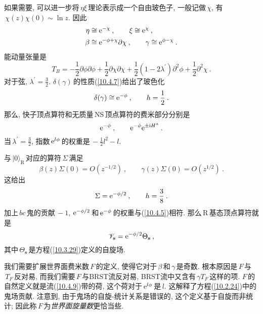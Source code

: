 如果需要, 可以进一步将$\,\eta\xi\,$理论表示成一个自由玻色子, 一般记做$\,\chi$, 有$\,\chi(z)\chi(0)\sim \ln z$. 因此
\begin{subequations}
\begin{align}
    \eta &\cong \mathrm{e}^{-\chi} \:, \qquad \xi \cong \mathrm{e}^{\chi} \:, \label{10.4.19a} \\
    \beta &\cong \mathrm{e}^{-\phi+\chi}\partial\chi\:, \qquad \gamma\cong \mathrm{e}^{\phi-\chi} \:. \label{10.4.19b}
\end{align} \label{10.4.19}
\end{subequations}
能动量张量是
\begin{equation}
    T_{B} = -\frac{1}{2}\partial\phi \partial\phi +\frac{1}{2}\partial\chi\partial\chi 
    +\frac{1}{2}(1-2\lambda^{\prime})\partial^{2}\phi + \frac{1}{2} \partial^{2}\chi \:. \label{10.4.20}
\end{equation}
对于弦, $\lambda^{\prime}=\frac{3}{2}$. $\delta(\gamma)\,$的性质(\ref{10.4.7})给出了玻色化
\begin{equation}
    \delta(\gamma)\cong \mathrm{e}^{-\phi}\:, \qquad h=\frac{1}{2} \:. \label{10.4.21}
\end{equation}
那么, 快子顶点算符和无质量\,NS\,顶点算符的费米部分分别是
\begin{equation}
    \mathrm{e}^{-\phi} \:, \qquad \mathrm{e}^{-\phi} \mathrm{e}^{\pm \mathrm{i} H^{a}}\:. \label{10.4.22}
\end{equation}
当$\,\lambda^{\prime}=\frac{3}{2}$, 指数$\,\mathrm{e}^{l\phi}\,$的权重是$\,-\frac{1}{2}l^{2}-l$.

与$\,\lvert 0\rangle _{\mathrm{R}}\,$对应的算符$\,\Sigma\,$满足
\begin{equation}
    \beta(z)\Sigma(0) = O(z^{-1/2}) \:, \qquad \gamma(z)\Sigma(0) = O(z^{1/2}) \:. \label{10.4.23}
\end{equation}
这给出
\begin{equation}
    \Sigma = \mathrm{e}^{-\phi/2} \:, \qquad h = \frac{3}{8} \: .\label{10.4.24}
\end{equation}
加上$\,bc\,$鬼的贡献$\,-1$, $\mathrm{e}^{-\phi/2}\,$和$\,\mathrm{e}^{-\phi}\,$的权重与(\ref{10.4.5})相符. 那么\,R\,基态顶点算符就是
\begin{equation}
    \mathscr{V}_{\mathbf{s}}=\mathrm{e}^{-\phi/2} \Theta_{\mathbf{s}} \:, \label{10.4.25}
\end{equation}
其中$\,\Theta_{\mathbf{s}}\,$是方程(\ref{10.3.29})定义的自旋场.

我们需要扩展世界面费米数$\,F\,$的定义, 使得它对于$\,\beta\,$和$\,\gamma\,$是奇数. 根本原因是$\,F\,$与$\,T_{F}\,$反对易, 而我们需要$\,F\,$与BRST流反对易, BRST流中又含有$\,\gamma T_{F}\,$这样的项. $F\,$的自然定义就是流(\ref{10.4.9})带的荷, 这个荷对于$\,\mathrm{e}^{l\phi}\,$是$\,l$. 这解释了方程(\ref{10.2.24})中的鬼场贡献. 注意到, 由于鬼场的自旋-统计关系是错误的, 这个定义基于自旋而非统计; 因此称$\,F\,$为{\emph{世界面旋量数}}更恰当些.


